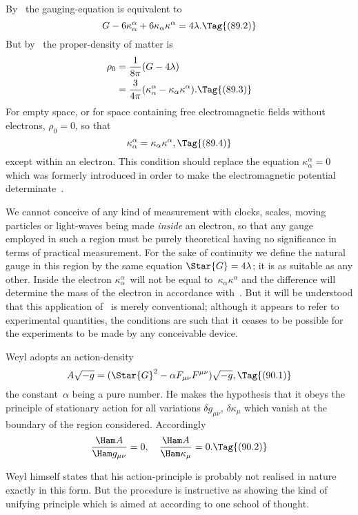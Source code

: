 \documentclass[12pt]{book}
\begin{document}
By~ the gauging\hyp{}equation is equivalent to
\[
G - 6\kappa_{\alpha}^{\alpha} + 6\kappa_{\alpha} \kappa^{\alpha} = 4\lambda.
\Tag{(89.2)}
\]
But by~ the proper\hyp{}density of matter is
\begin{align*}
  \rho_{0} &= \frac{1}{8\pi} (G - 4\lambda) \\
  &= \frac{3}{4\pi} (\kappa_{\alpha}^{\alpha} - \kappa_{\alpha} \kappa^{\alpha}).
  \Tag{(89.3)}
\end{align*}
For empty space, or for space containing free electromagnetic fields without
electrons, $\rho_{0} = 0$, so that
\[
\kappa_{\alpha}^{\alpha} = \kappa_{\alpha} \kappa^{\alpha},
\Tag{(89.4)}
\]
except within an electron. This condition should replace the equation $\kappa_{\alpha}^{\alpha} = 0$
which was formerly introduced in order to make the electromagnetic potential
determinate~.

We cannot conceive of any kind of measurement with clocks, scales,
moving particles or light\hyp{}waves being made \emph{inside} an electron, so that any
gauge employed in such a region must be purely theoretical having no significance
in terms of practical measurement. For the sake of continuity we
define the natural gauge in this region by the same equation $\Star{G} = 4\lambda$; it is
as suitable as any other. Inside the electron $\kappa_{\alpha}^{\alpha}$~will not be equal to~$\kappa_{\alpha} \kappa^{\alpha}$ and
the difference will determine the mass of the electron in accordance with~.
But it will be understood that this application of~ is merely
conventional; although it appears to refer to experimental quantities, the
conditions are such that it ceases to be possible for the experiments to be
made by any conceivable device.

%
%
%

Weyl adopts an action\hyp{}density
\[
A \sqrt{-g} = (\Star{G}^{2} - \alpha F_{\mu\nu} F^{\mu\nu}) \sqrt{-g},
\Tag{(90.1)}
\]
the constant~$\alpha$ being a pure number. He makes the hypothesis that it obeys
the principle of stationary action for all variations $\delta g_{\mu\nu}$, $\delta\kappa_{\mu}$ which vanish at
the boundary of the region considered. Accordingly
\[
\frac{\Ham A}{\Ham g_{\mu\nu}} = 0,\quad
\frac{\Ham A}{\Ham \kappa_{\mu}} = 0.
\Tag{(90.2)}
\]

Weyl himself states that his action\hyp{}principle is probably not realised in
nature exactly in this form. But the procedure is instructive as showing the
kind of unifying principle which is aimed at according to one school of
thought.
\end{document}
